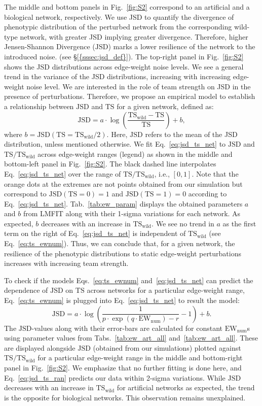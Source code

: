 \documentclass[11pt]{article}
\newcommand{\ts}{\mathrm{TS}}
\newcommand{\jsd}{\mathrm{JSD}}
\newcommand{\tsw}{\mathrm{TS_{wild}}}
\newcommand{\ewnum}{\mathrm{EW_{num}}}
\begin{document}
The middle and bottom panels in Fig.~\ref{fig:S2} correspond to an artificial and a biological network, respectively. We use JSD to quantify the divergence of phenotypic distribution of the perturbed network from the corresponding wild-type network, with greater JSD implying greater divergence. Therefore, higher Jensen-Shannon Divergence ($\jsd$) marks a lower resilience of the network to the introduced noise.  (see \S\ref{{sssec:jsd_def}}). The top-right panel in Fig.~\ref{fig:S2} shows the JSD distributions across edge-weight noise levels. We see a general trend in the variance of the JSD distributions, increasing with increasing edge-weight noise level. We are interested in the role of team strength on JSD in the presence of perturbations. Therefore, we propose an empirical model to establish a relationship between $\jsd$ and $\ts$ for a given network, defined as:
\begin{equation} \label{eq:jsd_ts_net}
    \jsd = a\cdot\log\left(\frac{\tsw-\ts}{\ts}\right)+b,
\end{equation}
where $b=\jsd(\ts=\tsw/2)$. Here, $\jsd$ refers to the mean of the JSD distribution, unless mentioned otherwise. We fit Eq.~\ref{eq:jsd_ts_net} to $\jsd$ and $\ts/\tsw$ across edge-weight ranges (legend) as shown in the middle and bottom-left panel in Fig.~\ref{fig:S2}. The black dashed line interpolates Eq.~\ref{eq:jsd_ts_net} over the range of $\ts/\tsw$, i.e., $[0,1]$. Note that the orange dots at the extremes are not points obtained from our simulation but correspond to $\jsd(\ts = 0) = 1$ and $\jsd(\ts = 1) = 0$ according to Eq.~\ref{eq:jsd_ts_net}. Tab.~\ref{tab:ew_param} displays the obtained parameters $a$ and $b$ from LMFIT along with their 1-sigma variations for each network. As expected, $b$ decreases with an increase in $\tsw$. We see no trend in $a$ as the first term on the right of Eq.~\ref{eq:jsd_ts_net} is independent of $\tsw$ (see Eq.~\ref{eq:ts_ewnum}). Thus, we can conclude that, for a given network, the resilience of the phenotypic distributions to static edge-weight perturbations increases with increasing team strength.

To check if the models Eqs.~\ref{eq:ts_ewnum} and~\ref{eq:jsd_ts_net} can predict the dependence of $\jsd$ on $\ts$ across networks for a particular edge-weight range, Eq.~\ref{eq:ts_ewnum} is plugged into Eq.~\ref{eq:jsd_ts_net} to result the model:
\begin{equation} \label{eq:jsd_ts_ran}
    \jsd = a\cdot\log\left(\frac{1}{p\cdot\exp(q\cdot\ewnum) - r}-1\right)+b.
\end{equation}
The $\jsd$-values along with their error-bars are calculated for constant $\ewnum$s using parameter values from Tabs.~\ref{tab:ew_art_all} and~\ref{tab:ew_art_all}. These are displayed alongside $\jsd$ (obtained from our simulations) plotted against $\ts/\tsw$ for a particular edge-weight range in the middle and bottom-right panel in Fig.~\ref{fig:S2}. We emphasize that no further fitting is done here, and Eq.~\ref{eq:jsd_ts_ran} predicts our data within 2-sigma variations. While $\jsd$ decreases with an increase in $\tsw$ for artificial networks as expected, the trend is the opposite for biological networks. This observation remains unexplained.
\end{document}
